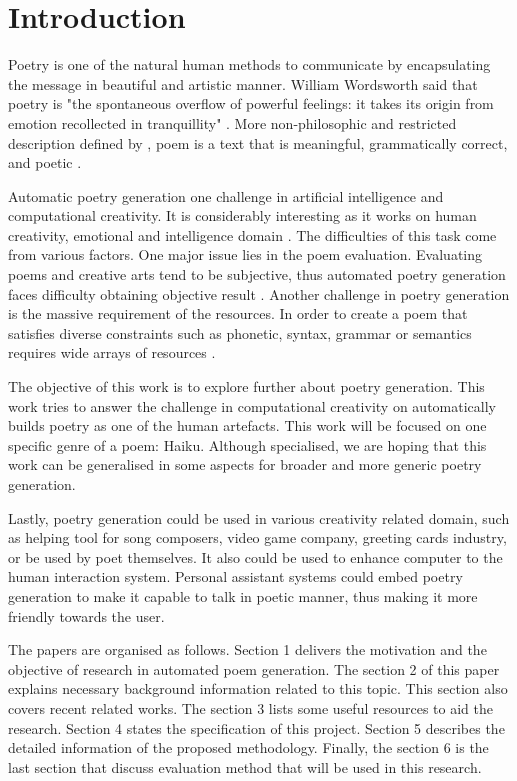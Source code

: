 \section{Introduction}



Poetry is one of the natural human methods to communicate by encapsulating the message in beautiful and artistic manner. William Wordsworth said that poetry is "the spontaneous overflow of powerful feelings: it takes its origin from emotion recollected in tranquillity" \cite{wordsworth1990preface}. More non-philosophic and restricted description defined by \citeauthor{manurung2004evolutionary}, poem is a text that is meaningful, grammatically correct, and poetic \cite{manurung2004evolutionary}.


Automatic poetry generation one challenge in artificial intelligence and computational creativity. It is considerably interesting as it works on human creativity, emotional and intelligence domain \cite{colton2012computational}. The difficulties of this task come from various factors. One major issue lies in the poem evaluation. Evaluating poems and creative arts tend to be subjective, thus automated poetry generation faces difficulty obtaining objective result \cite{binsted1996machine}. Another challenge in poetry generation is the massive requirement of the resources. In order to create a poem that satisfies diverse constraints such as phonetic, syntax, grammar or semantics requires wide arrays of resources \cite{manurung2000towards}. 


The objective of this work is to explore further about poetry generation. This work tries to answer the challenge in computational creativity on automatically builds poetry as one of the human artefacts. This work will be focused on one specific genre of a poem: Haiku. Although specialised, we are hoping that this work can be generalised in some aspects for broader and more generic poetry generation. 


Lastly, poetry generation could be used in various creativity related domain, such as helping tool for song composers, video game company, greeting cards industry, or be used by poet themselves. It also could be used to enhance computer to the human interaction system. Personal assistant systems could embed poetry generation to make it capable to talk in poetic manner, thus making it more friendly towards the user. 


The papers are organised as follows. Section 1 delivers the motivation and the objective of research in automated poem generation. The section 2 of this paper explains necessary background information related to this topic. This section also covers recent related works. The section 3 lists some useful resources to aid the research. Section 4 states the specification of this project. Section 5 describes the detailed information of the proposed methodology. Finally, the section 6 is the last section that discuss evaluation method that will be used in this research.

